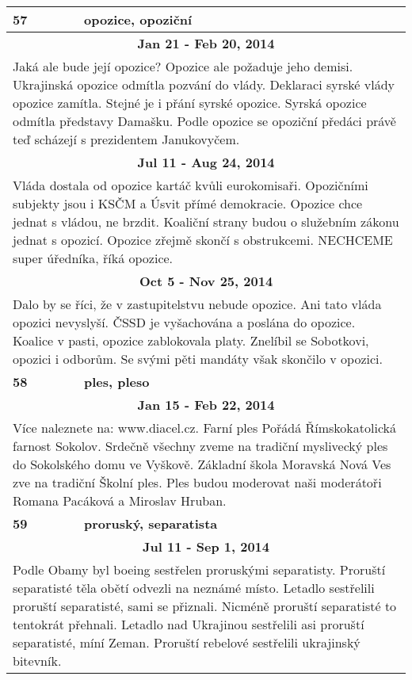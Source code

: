 \begin{tabularx}{\linewidth}{l l}
\bf 57 & \bf opozice, opoziční \\ \midrule
\multicolumn{2}{c}{\bf Jan 21 - Feb 20, 2014} \\
\multicolumn{2}{p{\linewidth}}{Jaká ale bude její opozice? Opozice ale požaduje jeho demisi. Ukrajinská opozice odmítla pozvání do vlády. Deklaraci syrské vlády opozice zamítla. Stejné je i přání syrské opozice. Syrská opozice odmítla představy Damašku. Podle opozice se opoziční předáci právě teď scházejí s prezidentem Janukovyčem.} \\ \midrule
\multicolumn{2}{c}{\bf Jul 11 - Aug 24, 2014} \\
\multicolumn{2}{p{\linewidth}}{Vláda dostala od opozice kartáč kvůli eurokomisaři. Opozičními subjekty jsou i KSČM a Úsvit přímé demokracie. Opozice chce jednat s vládou, ne brzdit. Koaliční strany budou o služebním zákonu jednat s opozicí. Opozice zřejmě skončí s obstrukcemi. NECHCEME super úředníka, říká opozice.} \\ \midrule
\multicolumn{2}{c}{\bf Oct 5 - Nov 25, 2014} \\
\multicolumn{2}{p{\linewidth}}{Dalo by se říci, že v zastupitelstvu nebude opozice. Ani tato vláda opozici nevyslyší. ČSSD je vyšachována a poslána do opozice. Koalice v pasti, opozice zablokovala platy. Znelíbil se Sobotkovi, opozici i odborům. Se svými pěti mandáty však skončilo v opozici.} \\ \midrule[1.5pt]

\bf 58 & \bf ples, pleso \\ \midrule
\multicolumn{2}{c}{\bf Jan 15 - Feb 22, 2014} \\
\multicolumn{2}{p{\linewidth}}{Více naleznete na: www.diacel.cz. Farní ples Pořádá Římskokatolická farnost Sokolov. Srdečně všechny zveme na tradiční myslivecký ples do Sokolského domu ve Vyškově. Základní škola Moravská Nová Ves zve na tradiční Školní ples. Ples budou moderovat naši moderátoři Romana Pacáková a Miroslav Hruban.} \\ \midrule[1.5pt]

\bf 59 & \bf proruský, separatista \\ \midrule
\multicolumn{2}{c}{\bf Jul 11 - Sep 1, 2014} \\
\multicolumn{2}{p{\linewidth}}{Podle Obamy byl boeing sestřelen proruskými separatisty. Proruští separatisté těla obětí odvezli na neznámé místo. Letadlo sestřelili proruští separatisté, sami se přiznali. Nicméně proruští separatisté to tentokrát přehnali. Letadlo nad Ukrajinou sestřelili asi proruští separatisté, míní Zeman. Proruští rebelové sestřelili ukrajinský bitevník.} \\ \midrule[1.5pt]


\end{tabularx}
